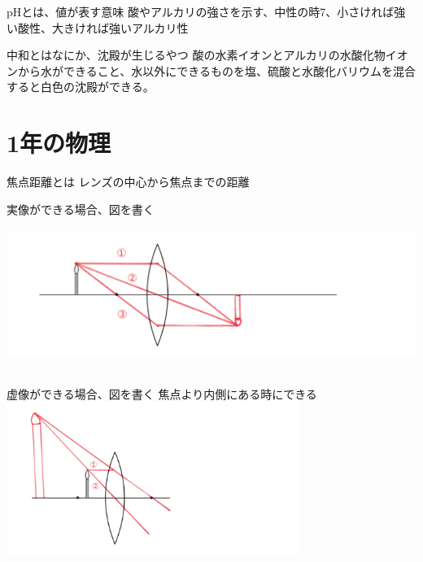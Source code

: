 \documentclass[10pt,dvipdfmx]{jsarticle}
\newcommand{\answer}[2]{{\color{orange}#2}}
\newcommand{\answer}[2]{\vspace{#1mm}}
\begin{document}
\begin{itembox}[l]{pHとは、値が表す意味}
	\answer{10}{
		酸やアルカリの強さを示す、中性の時7、小さければ強い酸性、大きければ強いアルカリ性
	}
\end{itembox}

\begin{itembox}[l]{中和とはなにか、沈殿が生じるやつ}
	\answer{10}{
		酸の水素イオンとアルカリの水酸化物イオンから水ができること、水以外にできるものを塩、硫酸と水酸化バリウムを混合すると白色の沈殿ができる。
	}
\end{itembox}

\newpage

\section{1年の物理}
\begin{itembox}[l]{焦点距離とは}
	\answer{10}{
		レンズの中心から焦点までの距離
	}
\end{itembox}

\begin{itembox}[l]{実像ができる場合、図を書く}
	\answer{20}{
		\includegraphics[height=5cm]{science_figure/zituzo.pdf}
	}
\end{itembox}

\begin{itembox}[l]{虚像ができる場合、図を書く}
	\answer{20}{
		焦点より内側にある時にできる
		\includegraphics[height=5cm]{science_figure/kyozo.pdf}
	}
\end{itembox}
\end{document}
